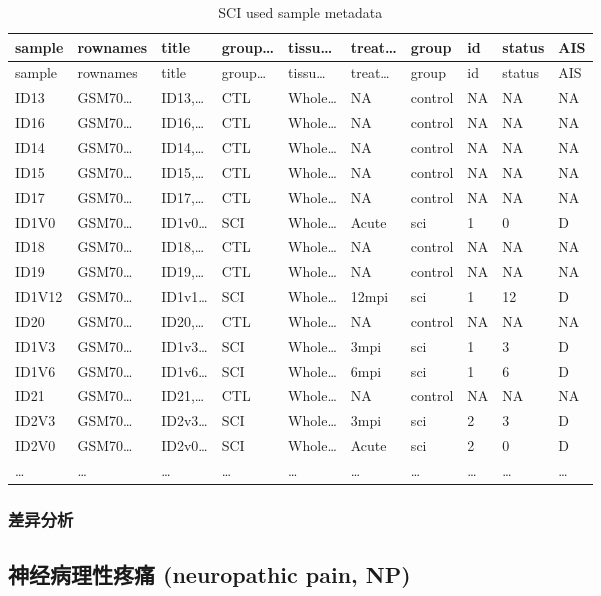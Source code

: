 \documentclass[
]{article}
\begin{document}
\begin{longtable}[]{@{}llllllllll@{}}
\caption{\label{tab:SCI-used-sample-metadata}SCI used sample metadata}\tabularnewline
\toprule
sample & rownames & title & group\ldots{} & tissu\ldots{} & treat\ldots{} & group & id & status & AIS\tabularnewline
\midrule
\endfirsthead
\toprule
sample & rownames & title & group\ldots{} & tissu\ldots{} & treat\ldots{} & group & id & status & AIS\tabularnewline
\midrule
\endhead
ID13 & GSM70\ldots{} & ID13,\ldots{} & CTL & Whole\ldots{} & NA & control & NA & NA & NA\tabularnewline
ID16 & GSM70\ldots{} & ID16,\ldots{} & CTL & Whole\ldots{} & NA & control & NA & NA & NA\tabularnewline
ID14 & GSM70\ldots{} & ID14,\ldots{} & CTL & Whole\ldots{} & NA & control & NA & NA & NA\tabularnewline
ID15 & GSM70\ldots{} & ID15,\ldots{} & CTL & Whole\ldots{} & NA & control & NA & NA & NA\tabularnewline
ID17 & GSM70\ldots{} & ID17,\ldots{} & CTL & Whole\ldots{} & NA & control & NA & NA & NA\tabularnewline
ID1V0 & GSM70\ldots{} & ID1v0\ldots{} & SCI & Whole\ldots{} & Acute & sci & 1 & 0 & D\tabularnewline
ID18 & GSM70\ldots{} & ID18,\ldots{} & CTL & Whole\ldots{} & NA & control & NA & NA & NA\tabularnewline
ID19 & GSM70\ldots{} & ID19,\ldots{} & CTL & Whole\ldots{} & NA & control & NA & NA & NA\tabularnewline
ID1V12 & GSM70\ldots{} & ID1v1\ldots{} & SCI & Whole\ldots{} & 12mpi & sci & 1 & 12 & D\tabularnewline
ID20 & GSM70\ldots{} & ID20,\ldots{} & CTL & Whole\ldots{} & NA & control & NA & NA & NA\tabularnewline
ID1V3 & GSM70\ldots{} & ID1v3\ldots{} & SCI & Whole\ldots{} & 3mpi & sci & 1 & 3 & D\tabularnewline
ID1V6 & GSM70\ldots{} & ID1v6\ldots{} & SCI & Whole\ldots{} & 6mpi & sci & 1 & 6 & D\tabularnewline
ID21 & GSM70\ldots{} & ID21,\ldots{} & CTL & Whole\ldots{} & NA & control & NA & NA & NA\tabularnewline
ID2V3 & GSM70\ldots{} & ID2v3\ldots{} & SCI & Whole\ldots{} & 3mpi & sci & 2 & 3 & D\tabularnewline
ID2V0 & GSM70\ldots{} & ID2v0\ldots{} & SCI & Whole\ldots{} & Acute & sci & 2 & 0 & D\tabularnewline
\ldots{} & \ldots{} & \ldots{} & \ldots{} & \ldots{} & \ldots{} & \ldots{} & \ldots{} & \ldots{} & \ldots{}\tabularnewline
\bottomrule
\end{longtable}

\hypertarget{ux5deeux5f02ux5206ux6790}{%
\subsubsection{差异分析}\label{ux5deeux5f02ux5206ux6790}}

\hypertarget{ux795eux7ecfux75c5ux7406ux6027ux75bcux75db-neuropathic-pain-np}{%
\subsection{神经病理性疼痛 (neuropathic pain, NP)}\label{ux795eux7ecfux75c5ux7406ux6027ux75bcux75db-neuropathic-pain-np}}
\end{document}
